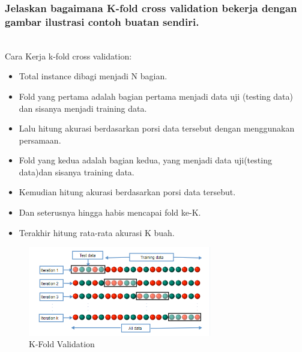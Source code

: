 \subsubsection{Jelaskan bagaimana K-fold cross validation bekerja dengan gambar ilustrasi contoh buatan sendiri.}
\hfill\\
Cara Kerja k-fold cross validation:
\begin{itemize}
	\item Total instance dibagi menjadi N bagian.
	\item Fold yang pertama adalah bagian pertama menjadi data uji (testing data) dan sisanya menjadi training data.
	\item Lalu hitung akurasi berdasarkan porsi data tersebut dengan menggunakan persamaan.
	\item Fold yang kedua adalah bagian kedua, yang menjadi data uji(testing data)dan sisanya training  data.
	\item Kemudian hitung akurasi berdasarkan porsi data tersebut.
	\item Dan seterusnya hingga habis mencapai fold ke-K.
	\item Terakhir hitung rata-rata akurasi K buah.
\end{itemize}
\begin{figure}[H]
    \includegraphics[width=8cm]{figures/1174087/2/kf.png}
    \centering
    \caption{K-Fold Validation}
\end{figure}


